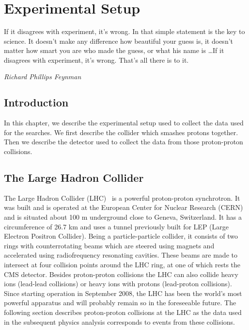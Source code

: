\chapter{Experimental Setup}
\label{chap:exper_setup}
\epigraph{If it disagrees with experiment, it’s wrong. In that simple statement is the key to science. It doesn’t make any difference how beautiful your guess is, it doesn’t matter how smart you are who made the guess, or what his name is \ldots  If it disagrees with experiment, it’s wrong. That’s all there is to it.}{\textit{Richard Phillips Feynman}}
\vskip 0.5in
\section{Introduction}
In this chapter, we describe the experimental setup used to collect the data used for the searches. We first describe the collider which smashes protons together. Then we describe the detector used to collect the data from those proton-proton collisions.
\section{The Large Hadron Collider}
\label{sec:LHC}

The Large Hadron Collider (LHC)~\cite{lhcmachine} is a powerful proton-proton synchrotron. It was built and is operated at the European Center for Nuclear Research (CERN) and is situated about 100 m underground close to Geneva, Switzerland. It has a circumference of 26.7 km and uses a tunnel previously built for LEP (Large Electron Positron Collider). Being a particle-particle collider, it consists of two rings with counterrotating beams which are steered using magnets and accelerated using radiofrequency resonating cavities. These beams are made to intersect at four collision points around the LHC ring, at one of which rests the CMS detector. Besides proton-proton collisions the LHC can also collide heavy ions (lead-lead collisions) or heavy ions with protons (lead-proton collisions). Since starting operation in September 2008, the LHC has been the world's most powerful apparatus and will probably remain so in the foreseeable future. The following section describes proton-proton collisions at the LHC as the data used in the subsequent physics analysis corresponds to events from these collisions.

